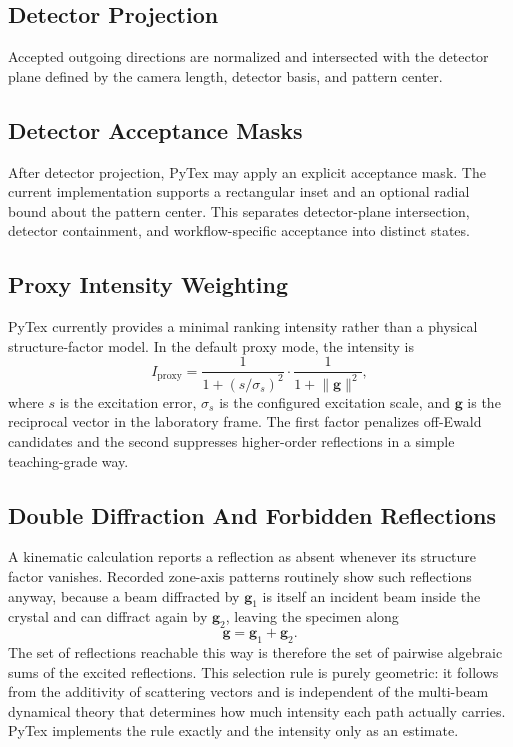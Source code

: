 \subsection{Detector Projection}

Accepted outgoing directions are normalized and intersected with the detector plane defined by the camera length, detector basis, and pattern center.

\subsection{Detector Acceptance Masks}

After detector projection, PyTex may apply an explicit acceptance mask. The current implementation supports a rectangular inset and an optional radial bound about the pattern center. This separates detector-plane intersection, detector containment, and workflow-specific acceptance into distinct states.

\subsection{Proxy Intensity Weighting}

PyTex currently provides a minimal ranking intensity rather than a physical structure-factor model. In the default proxy mode, the intensity is
\[
  I_{\mathrm{proxy}} =
  \frac{1}{1 + \left(s / \sigma_s\right)^2}
  \cdot
  \frac{1}{1 + \lVert \mathbf{g} \rVert^2},
\]
where $s$ is the excitation error, $\sigma_s$ is the configured excitation scale, and $\mathbf{g}$ is the reciprocal vector in the laboratory frame. The first factor penalizes off-Ewald candidates and the second suppresses higher-order reflections in a simple teaching-grade way.

\subsection{Double Diffraction And Forbidden Reflections}

A kinematic calculation reports a reflection as absent whenever its structure factor vanishes. Recorded zone-axis patterns routinely show such reflections anyway, because a beam diffracted by $\mathbf{g}_1$ is itself an incident beam inside the crystal and can diffract again by $\mathbf{g}_2$, leaving the specimen along
\[
  \mathbf{g} = \mathbf{g}_1 + \mathbf{g}_2 .
\]
The set of reflections reachable this way is therefore the set of pairwise algebraic sums of the excited reflections. This selection rule is purely geometric: it follows from the additivity of scattering vectors and is independent of the multi-beam dynamical theory that determines how much intensity each path actually carries. PyTex implements the rule exactly and the intensity only as an estimate.

